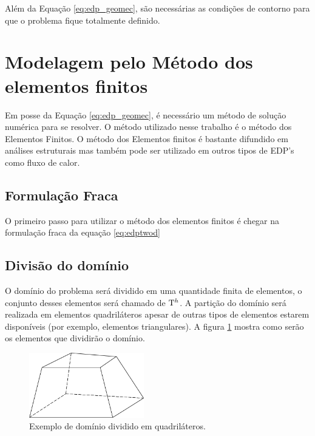 Além da Equação \eqref{eq:edp_geomec}, são necessárias as condições de contorno para que o problema fique totalmente definido. 

\section{Modelagem pelo Método dos elementos finitos}

Em posse da Equação \eqref{eq:edp_geomec}, é necessário um método de solução numérica para se resolver. O método utilizado nesse trabalho é o método dos Elementos Finitos. O método dos Elementos finitos é bastante difundido em análises estruturais mas também pode ser utilizado em outros tipos de EDP's como fluxo de calor. 

\subsection{Formulação Fraca}

O primeiro passo para utilizar o método dos elementos finitos é chegar na formulação fraca da equação \eqref{eq:edptwod}

\subsection{Divisão do domínio}

O domínio do problema será dividido em uma quantidade finita de elementos, o conjunto desses elementos será chamado de $\mathrm{T}^h$.  A partição do domínio será realizada em elementos quadriláteros apesar de outras tipos de elementos estarem disponíveis (por exemplo, elementos triangulares). A figura \ref{fig:elemento} mostra como serão os elementos que dividirão o domínio.

\begin{figure}[!htbp]
\centering
\includegraphics[width=5cm]{chap01/elemento_original.png}
\caption{Exemplo de domínio dividido em quadriláteros.}
\label{fig:elemento}
\end{figure}

